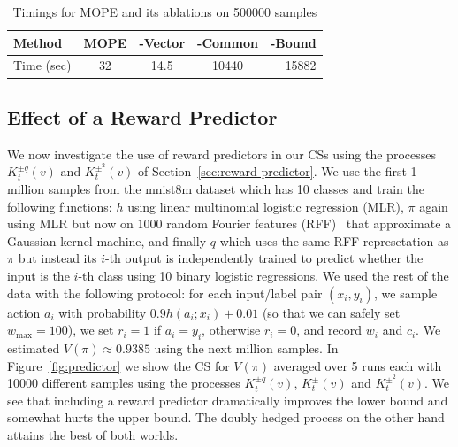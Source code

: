 \begin{table}[t]
\caption{Timings for MOPE and its ablations on 500000 samples}
\label{tab:timings}
\centering
\begin{small}
\begin{sc}
\begin{tabular}{lcccr}
\toprule
Method & MOPE & -Vector & -Common & -Bound \\
\midrule
Time (sec)& 32     & 14.5  & 10440 & 15882 \\
\bottomrule
\end{tabular}
\end{sc}
\end{small}
\vspace{-0.05in}
\end{table}

\subsection{Effect of a Reward Predictor}
\label{sec:rp-experiment}
We now investigate the use of  
reward predictors in our CSs using the processes
$K_t^{\pm q}(v)$ and $K_t^{\pm^2}(v)$ 
of Section~\ref{sec:reward-predictor}.
We use the first 1 million samples from the mnist8m
dataset which has 10 classes and train the following
functions: $h$ using linear multinomial 
logistic regression (MLR), $\pi$ again using MLR but
now on $1000$ random Fourier 
features (RFF)~\cite{rahimi2007random} that approximate 
a Gaussian kernel machine, and finally $q$ which
uses the same RFF represetation as $\pi$ but instead
its $i$-th output is independently trained 
to predict whether the input is the $i$-th class
using 10 binary logistic regressions.
We used the rest of the data with the following 
protocol: for each input/label pair $(x_i,y_i)$, we sample 
action $a_i$ with probability $0.9h(a_i;x_i)+0.01$
(so that we can safely set $w_{\max}=100$),
we set $r_i=1$ if $a_i=y_i$, otherwise $r_i=0$, 
and record $w_i$ and $c_i$. We estimated 
$V(\pi)\approx 0.9385$ using the next million samples. In Figure~\ref{fig:predictor}
we show the CS for $V(\pi)$ averaged over 5 runs each 
with 10000 different samples using the processes 
$K_t^{\pm q}(v)$, $K_t^{\pm}(v)$ and $K_t^{\pm^2}(v)$.
We see that including 
a reward predictor dramatically improves the lower bound
and somewhat hurts the upper bound. 
The doubly hedged process on the other hand attains the 
best of both worlds.

